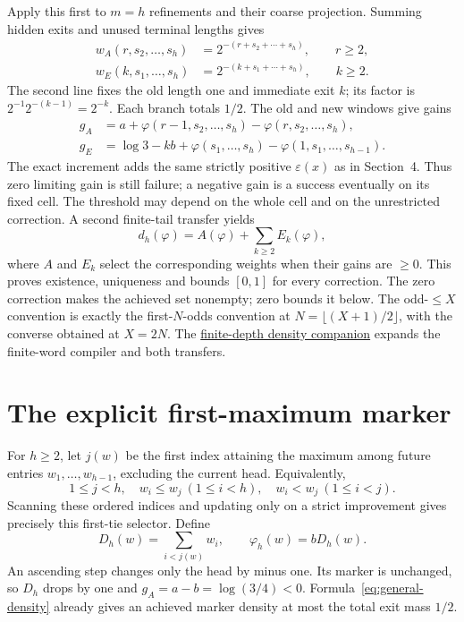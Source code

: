 \documentclass[11pt,letterpaper]{article}
\begin{document}
Apply this first to $m=h$ refinements and their coarse projection. Summing
hidden exits and unused terminal lengths gives
\begin{align*}
 w_A(r,s_2,\ldots,s_h)&=2^{-(r+s_2+\cdots+s_h)},\qquad r\ge2,\\
 w_E(k,s_1,\ldots,s_h)&=2^{-(k+s_1+\cdots+s_h)},\qquad k\ge2.
\end{align*}
The second line fixes the old length one and immediate exit $k$; its factor
is $2^{-1}2^{-(k-1)}=2^{-k}$. Each branch totals $1/2$.
The old and new windows give gains
\begin{align*}
 g_A&=a+\varphi(r-1,s_2,\ldots,s_h)-\varphi(r,s_2,\ldots,s_h),\\
 g_E&=\log3-kb+\varphi(s_1,\ldots,s_h)
                    -\varphi(1,s_1,\ldots,s_{h-1}).
\end{align*}
The exact increment adds the same strictly positive $\varepsilon(x)$ as in
Section~4. Thus zero limiting gain is still failure; a negative gain is a
success eventually on its fixed cell. The threshold may depend on the whole
cell and on the unrestricted correction. A second finite-tail transfer yields
\begin{equation}\label{eq:general-density}
 d_h(\varphi)=A(\varphi)+\sum_{k\ge2}E_k(\varphi),
\end{equation}
where $A$ and $E_k$ select the corresponding weights when their gains are
$\ge0$. This proves existence, uniqueness and bounds $[0,1]$ for every
correction. The zero correction makes the achieved set nonempty; zero bounds
it below. The odd-$\le X$ convention is exactly the first-$N$-odds convention
at $N=\lfloor(X+1)/2\rfloor$, with the converse obtained at $X=2N$.
The \href{../../lean/external_population/GENERAL_DENSITY_PROOF.md}{finite-depth density companion}
expands the finite-word compiler and both transfers.

\section{The explicit first-maximum marker}\label{sec:marker}
For $h\ge2$, let $j(w)$ be the first index attaining the maximum among
future entries $w_1,\ldots,w_{h-1}$, excluding the current head. Equivalently,
\[
 1\le j<h,\quad w_i\le w_j\ (1\le i<h),\quad
 w_i<w_j\ (1\le i<j).
\]
Scanning these ordered indices and updating only on a strict improvement
gives precisely this first-tie selector. Define
\[
 D_h(w)=\sum_{i<j(w)}w_i,\qquad \varphi_h(w)=bD_h(w).
\]
An ascending step changes only the head by minus one. Its marker is unchanged,
so $D_h$ drops by one and $g_A=a-b=\log(3/4)<0$. Formula~\eqref{eq:general-density}
already gives an achieved marker density at most the total exit mass $1/2$.
\end{document}
